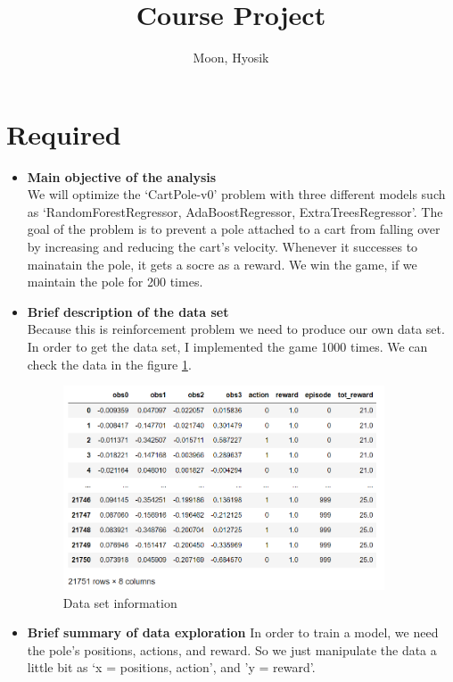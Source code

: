\documentclass[12pt]{article}
\title{Course Project}
\author{
  Moon, Hyosik
  }
\begin{document}
\maketitle

\section{Required}

\begin{itemize}
\item \textbf{Main objective of the analysis} \\
We will optimize the `CartPole-v0' problem with three different models such as `RandomForestRegressor, AdaBoostRegressor, ExtraTreesRegressor'. The goal of the problem is to prevent a pole attached to a cart from falling over by increasing and reducing the cart's velocity. Whenever it successes to mainatain the pole, it gets a socre as a reward. We win the game, if we maintain the pole for 200 times.

\item \textbf{Brief description of the data set} \\
Because this is reinforcement problem we need to produce our own data set. In order to get the data set, I implemented the game 1000 times. We can check the data in the figure \ref{data}.

\begin{figure}[H]
    \centering
    \includegraphics[width=0.9\textwidth]{figures/data.png}
    \caption{Data set information}\label{data}
\end{figure}

\item \textbf{Brief summary of data exploration}
In order to train a model, we need the pole's positions, actions, and reward. So we just manipulate the data a little bit as `x = positions, action', and 'y = reward'.
    

\end{itemize}
\end{document}
